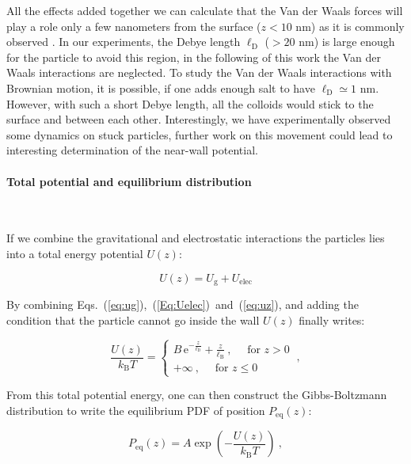 All the effects added together we can calculate that the Van der Waals forces will play a role only a few nanometers from the surface ($z < 10$ nm) as it is commonly observed \cite{prieve_measurement_1999}. In our experiments, the Debye length $\ell _\mathrm{D}$ ($>20$ nm) is large enough for the particle to avoid this region, in the following of this work the Van der Waals interactions are neglected. To study the Van der Waals interactions with Brownian motion, it is possible, if one adds enough salt to have $\ell_\mathrm{D} \simeq 1$ nm. However, with such a short Debye length, all the colloids would stick to the surface and between each other. Interestingly, we have experimentally observed some dynamics on stuck particles, further work on this movement could lead to interesting determination of the near-wall potential. 



\paragraph{Total potential and equilibrium distribution}\mbox{}\\
\label{test}
\vspace{0.10cm}

If we combine the gravitational and electrostatic interactions the particles lies into a total energy potential $U(z)$:

\begin{equation}
	U(z) = U_\mathrm{g} + U_\mathrm{elec}
	\label{eq:uz}
\end{equation}

By combining Eqs.~(\ref{eq:ug}),~(\ref{Eq:Uelec})~and~(\ref{eq:uz}), and adding the condition that the particle cannot go inside the wall $U(z)$ finally writes:

\begin{equation}
	\frac{U(z)}{k_\mathrm{B}T} =  \left\{
	\begin{array}{l}
		\displaystyle B\,\textrm{e}^{-\frac{z}{\ell_\mathrm{D}}} + \frac{z}{\ell_\mathrm{B}}\ ,\quad \text{ for } z>0 \\
		+\infty\ ,\quad  \text{ for } z\leq 0
	\end{array}
	\right. \ ,
	\label{Eq:PDF}
\end{equation}

From this total potential energy, one can then construct the Gibbs-Boltzmann distribution to write the equilibrium \gls{PDF} of position $P_{\mathrm{eq}}(z)$:

\begin{equation}
	P_\mathrm{eq} (z)  = A \exp \left( -\frac{U(z)}{k_\mathrm{B}T} \right) ~,
	\label{Eq.Peq}
\end{equation} 


